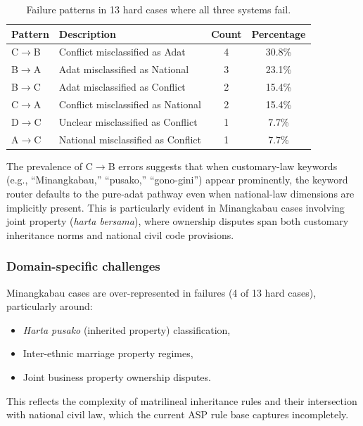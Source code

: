 \documentclass[11pt]{article}
\begin{document}
\begin{table}[h]
\centering
\begin{tabular}{llcc}
\toprule
Pattern & Description & Count & Percentage \\
\midrule
C$\rightarrow$B & Conflict misclassified as Adat & 4 & 30.8\% \\
B$\rightarrow$A & Adat misclassified as National & 3 & 23.1\% \\
B$\rightarrow$C & Adat misclassified as Conflict & 2 & 15.4\% \\
C$\rightarrow$A & Conflict misclassified as National & 2 & 15.4\% \\
D$\rightarrow$C & Unclear misclassified as Conflict & 1 & 7.7\% \\
A$\rightarrow$C & National misclassified as Conflict & 1 & 7.7\% \\
\bottomrule
\end{tabular}
\caption{Failure patterns in 13 hard cases where all three systems fail.}
\label{tab:failure-patterns}
\end{table}

The prevalence of C$\rightarrow$B errors suggests that when customary-law keywords (e.g., ``Minangkabau,'' ``pusako,'' ``gono-gini'') appear prominently, the keyword router defaults to the pure-adat pathway even when national-law dimensions are implicitly present. This is particularly evident in Minangkabau cases involving joint property (\textit{harta bersama}), where ownership disputes span both customary inheritance norms and national civil code provisions.

\subsubsection{Domain-specific challenges}

Minangkabau cases are over-represented in failures (4 of 13 hard cases), particularly around:
\begin{itemize}[nosep]
  \item \textit{Harta pusako} (inherited property) classification,
  \item Inter-ethnic marriage property regimes,
  \item Joint business property ownership disputes.
\end{itemize}

This reflects the complexity of matrilineal inheritance rules and their intersection with national civil law, which the current ASP rule base captures incompletely.
\end{document}
